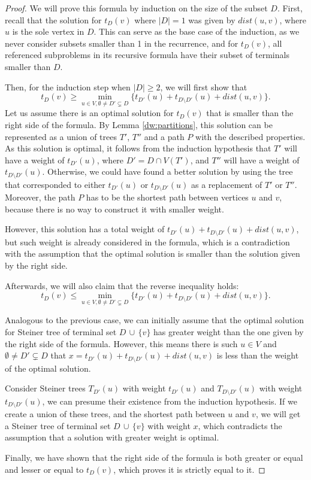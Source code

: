 \documentclass[thesis=M,english,hidelinks]{FITthesis}[2012/10/20]
\theoremstyle{definition}
\begin{document}
\begin{proof}
    We will prove this formula by induction on the size of the subset $D$. First, recall that the solution for $t_D(v)$
    where $|D| = 1$ was given by $dist(u, v)$, where $u$ is the sole vertex in $D$. This can serve as the base case of
    the induction, as we never consider subsets smaller than 1 in the recurrence, and for $t_D(v)$, all referenced
    subproblems in its recursive formula have their subset of terminals smaller than $D$.

    Then, for the induction step when $|D| \geq 2$, we will first show that
    $$
    t_D(v) \geq \min_{u \in V, \emptyset \neq D' \subsetneq D} \{ t_{D'}(u) + t_{D \setminus D'}(u) + dist(u, v) \}.
    $$
    Let us assume there is an optimal solution for $t_D(v)$ that is smaller than the right side of the formula. By Lemma
    \ref{dw:partitions}, this solution can be represented as a union of trees $T'$, $T''$ and a path $P$ with the
    described properties. As this solution is optimal, it follows from the induction hypothesis that $T'$
    will have a weight of $t_{D'}(u)$, where $D' = D \cap V(T')$, and $T''$ will have a weight of $t_{D \setminus
    D'}(u)$. Otherwise, we could have found a better solution by using the tree that corresponded to either $t_{D'}(u)$
    or $t_{D \setminus D'}(u)$ as a replacement of $T'$ or $T''$. Moreover, the path $P$ has to be the shortest path
    between vertices $u$ and $v$, because there is no way to construct it with smaller weight.

    However, this solution has a total weight of $t_{D'}(u) + t_{D \setminus D'}(u) + dist(u, v)$, but such weight is
    already considered in the formula, which is a contradiction with the assumption that the optimal solution is
    smaller than the solution given by the right side.

    Afterwards, we will also claim that the reverse inequality holds:
    $$
    t_D(v) \leq \min_{u \in V, \emptyset \neq D' \subsetneq D} \{ t_{D'}(u) + t_{D \setminus D'}(u) + dist(u, v) \}.
    $$

    Analogous to the previous case, we can initially assume that the optimal solution for Steiner tree of terminal set
    $D\, \cup\,\{v\}$ has greater weight than the one given by the right side of the formula. However, this means there
    is such $u \in V$ and $\emptyset \neq D' \subsetneq D$ that $x = t_{D'}(u) + t_{D \setminus D'}(u) + dist(u, v)$ is
    less than the weight of the optimal solution.

    Consider Steiner trees $T_{D'}(u)$ with weight $t_{D'}(u)$ and $T_{D \setminus D'}(u)$ with weight $t_{D \setminus
    D'}(u)$, we can presume their existence from the induction hypothesis. If we create a union of these trees, and the
    shortest path between $u$ and $v$, we will get a Steiner tree of terminal set $D\, \cup\,\{v\}$ with weight $x$,
    which contradicts the assumption that a solution with greater weight is optimal.

    Finally, we have shown that the right side of the formula is both greater or equal and lesser or equal to $t_D(v)$,
    which proves it is strictly equal to it.
\end{proof}
\end{document}

